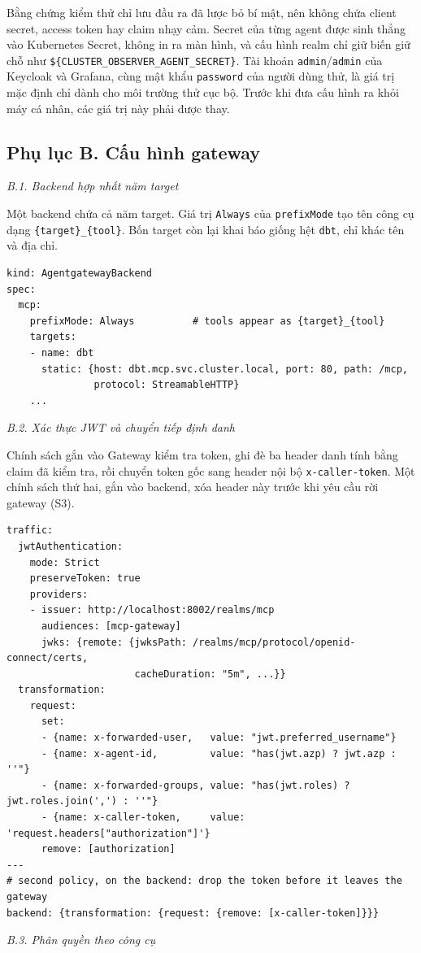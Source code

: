 \documentclass[a4paper]{article}
\begin{document}
Bằng chứng kiểm thử chỉ lưu đầu ra đã lược bỏ bí mật, nên không chứa client secret, access token hay claim nhạy cảm. Secret của từng agent được sinh thẳng vào Kubernetes Secret, không in ra màn hình, và cấu hình realm chỉ giữ biến giữ chỗ như \texttt{\$\{CLUSTER\_OBSERVER\_AGENT\_SECRET\}}. Tài khoản \texttt{admin}/\texttt{admin} của Keycloak và Grafana, cùng mật khẩu \texttt{password} của người dùng thử, là giá trị mặc định chỉ dành cho môi trường thử cục bộ. Trước khi đưa cấu hình ra khỏi máy cá nhân, các giá trị này phải được thay.

\subsection*{Phụ lục B. Cấu hình gateway}
\textit{B.1. Backend hợp nhất năm target}

Một backend chứa cả năm target. Giá trị \texttt{Always} của \texttt{prefixMode} tạo tên công cụ dạng \texttt{\{target\}\_\{tool\}}. Bốn target còn lại khai báo giống hệt \texttt{dbt}, chỉ khác tên và địa chỉ.
\par\noindent\begin{minipage}{\linewidth}
\begin{lstlisting}
kind: AgentgatewayBackend
spec:
  mcp:
    prefixMode: Always          # tools appear as {target}_{tool}
    targets:
    - name: dbt
      static: {host: dbt.mcp.svc.cluster.local, port: 80, path: /mcp,
               protocol: StreamableHTTP}
    ...
\end{lstlisting}
\end{minipage}\par
{}\textit{B.2. Xác thực JWT và chuyển tiếp định danh}

Chính sách gắn vào Gateway kiểm tra token, ghi đè ba header danh tính bằng claim đã kiểm tra, rồi chuyển token gốc sang header nội bộ \texttt{x-caller-token}. Một chính sách thứ hai, gắn vào backend, xóa header này trước khi yêu cầu rời gateway (S3).
\par\noindent\begin{minipage}{\linewidth}
\begin{lstlisting}
traffic:
  jwtAuthentication:
    mode: Strict
    preserveToken: true
    providers:
    - issuer: http://localhost:8002/realms/mcp
      audiences: [mcp-gateway]
      jwks: {remote: {jwksPath: /realms/mcp/protocol/openid-connect/certs,
                      cacheDuration: "5m", ...}}
  transformation:
    request:
      set:
      - {name: x-forwarded-user,   value: "jwt.preferred_username"}
      - {name: x-agent-id,         value: "has(jwt.azp) ? jwt.azp : ''"}
      - {name: x-forwarded-groups, value: "has(jwt.roles) ? jwt.roles.join(',') : ''"}
      - {name: x-caller-token,     value: 'request.headers["authorization"]'}
      remove: [authorization]
---
# second policy, on the backend: drop the token before it leaves the gateway
backend: {transformation: {request: {remove: [x-caller-token]}}}
\end{lstlisting}
\end{minipage}\par
{}\textit{B.3. Phân quyền theo công cụ}
\end{document}
